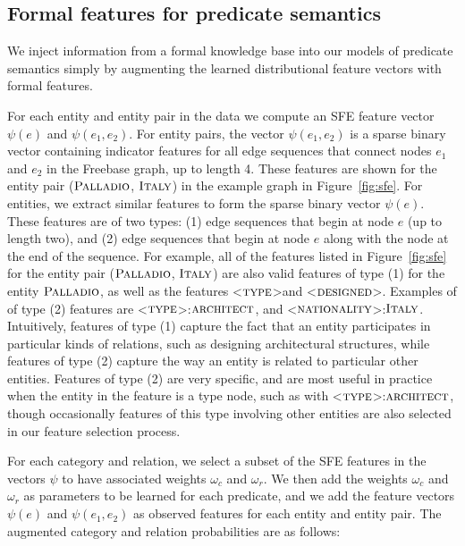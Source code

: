 \documentclass[11pt]{article}
\newcommand{\figref}[1]{Figure~\ref{fig:#1}}
\newcommand{\formalpredicate}[1]{\ensuremath{\textsc{#1}}}
\newcommand{\entity}[1]{\ensuremath{\textsc{#1}}}
\begin{document}
\subsection{Formal features for predicate semantics}
\label{sec:formal-and-distributional}

We inject information from a formal knowledge base into our models of predicate
semantics simply by augmenting the learned distributional feature vectors with
formal features.

For each entity and entity pair in the data we compute an SFE feature vector
$\psi(e)$ and $\psi(e_1, e_2)$.  For entity pairs, the vector $\psi(e_1, e_2)$
is a sparse binary vector containing indicator features for all edge sequences
that connect nodes $e_1$ and $e_2$ in the Freebase graph, up to length 4.
These features are shown for the entity pair (\entity{Palladio},
\entity{Italy}) in the example graph in \figref{sfe}.  For entities, we extract
similar features to form the sparse binary vector $\psi(e)$.  These features
are of two types: (1) edge sequences that begin at node $e$ (up to length two),
and (2) edge sequences that begin at node $e$ along with the node at the end of
the sequence.  For example, all of the features listed in \figref{sfe} for the
entity pair (\entity{Palladio}, \entity{Italy}) are also valid features of type
(1) for the entity \entity{Palladio}, as well as the features
\textless\formalpredicate{type}\textgreater and
\textless\formalpredicate{designed}\textgreater.  Examples of of type (2) features
are \textless\formalpredicate{type}\textgreater:\entity{architect}, and
\textless\formalpredicate{nationality}\textgreater:\entity{Italy}.  Intuitively,
features of type (1) capture the fact that an entity participates in particular
kinds of relations, such as designing architectural structures, while features
of type (2) capture the way an entity is related to particular other entities.
Features of type (2) are very specific, and are most useful in practice when
the entity in the feature is a type node, such as with
\textless\formalpredicate{type}\textgreater:\entity{architect}, though occasionally
features of this type involving other entities are also selected in our feature
selection process.

For each category and relation, we select a subset of the SFE features in the
vectors $\psi$ to have associated weights $\omega_c$ and $\omega_r$.  We then
add the weights $\omega_c$ and $\omega_r$ as parameters to be learned for each
predicate, and we add the feature vectors $\psi(e)$ and $\psi(e_1, e_2)$ as
observed features for each entity and entity pair.  The augmented category and
relation probabilities are as follows:
\end{document}
